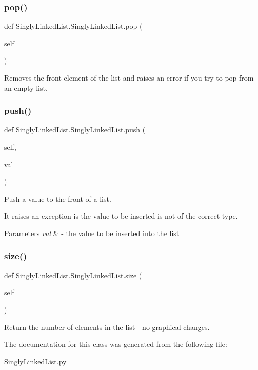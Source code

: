 \subsubsection{\texorpdfstring{pop()}{pop()}}
{\footnotesize\ttfamily def Singly\+Linked\+List.\+Singly\+Linked\+List.\+pop (\begin{DoxyParamCaption}\item[{}]{self }\end{DoxyParamCaption})}



Removes the front element of the list and raises an error if you try to pop from an empty list. 

\mbox{\label{class_singly_linked_list_1_1_singly_linked_list_a7e948d77c8c645f33f4fea05844e7a76}} 
\subsubsection{\texorpdfstring{push()}{push()}}
{\footnotesize\ttfamily def Singly\+Linked\+List.\+Singly\+Linked\+List.\+push (\begin{DoxyParamCaption}\item[{}]{self,  }\item[{}]{val }\end{DoxyParamCaption})}



Push a value to the front of a list. 

It raises an exception is the value to be inserted is not of the correct type.


\begin{DoxyParams}{Parameters}
{\em val} & -\/ the value to be inserted into the list \\
\hline
\end{DoxyParams}
\mbox{\label{class_singly_linked_list_1_1_singly_linked_list_a96f6f50cf9bed918fe1f5248c1649f0c}} 
\subsubsection{\texorpdfstring{size()}{size()}}
{\footnotesize\ttfamily def Singly\+Linked\+List.\+Singly\+Linked\+List.\+size (\begin{DoxyParamCaption}\item[{}]{self }\end{DoxyParamCaption})}



Return the number of elements in the list -\/ no graphical changes. 



The documentation for this class was generated from the following file\+:\begin{DoxyCompactItemize}
\item 
Singly\+Linked\+List.\+py\end{DoxyCompactItemize}
